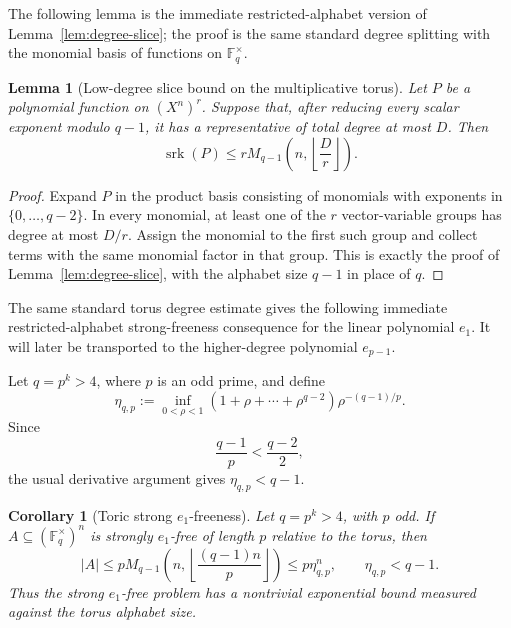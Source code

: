 \documentclass[10pt,a4paper]{amsart}
\newtheorem{corollary}[theorem]{Corollary}
\newtheorem{lemma}[theorem]{Lemma}
\theoremstyle{definition}
\newcommand{\F}{\mathbb F}
\newcommand{\srk}{\operatorname{srk}}
\newcommand{\1}{\mathbf 1}
\begin{document}
The following lemma is the immediate restricted-alphabet version of Lemma~\ref{lem:degree-slice}; the proof is the same standard degree splitting with the monomial basis of functions on $\F_q^\times$.

\begin{lemma}[Low-degree slice bound on the multiplicative torus]\label{lem:torus-degree}
Let $P$ be a polynomial function on $(X^n)^r$.  Suppose that, after reducing every scalar exponent modulo $q-1$, it has a representative of total degree at most $D$.  Then
\[
 \srk(P)\le rM_{q-1}\left(n,\left\lfloor\frac Dr\right\rfloor\right).
\]
\end{lemma}

\begin{proof}
Expand $P$ in the product basis consisting of monomials with exponents in $\{0,\ldots,q-2\}$.  In every monomial, at least one of the $r$ vector-variable groups has degree at most $D/r$.  Assign the monomial to the first such group and collect terms with the same monomial factor in that group.  This is exactly the proof of Lemma~\ref{lem:degree-slice}, with the alphabet size $q-1$ in place of $q$.
\end{proof}

The same standard torus degree estimate gives the following immediate restricted-alphabet strong-freeness consequence for the linear polynomial $e_1$.  It will later be transported to the higher-degree polynomial $e_{p-1}$.

Let $q=p^k>4$, where $p$ is an odd prime, and define
\[
 \eta_{q,p}:=
 \inf_{0<\rho<1}
 (1+\rho+\cdots+\rho^{q-2})
 \rho^{-(q-1)/p}.
\]
Since
\[
 \frac{q-1}{p}<\frac{q-2}{2},
\]
the usual derivative argument gives $\eta_{q,p}<q-1$.

\begin{corollary}[Toric strong $e_1$-freeness]\label{cor:toric-strong-e1}
Let $q=p^k>4$, with $p$ odd.  If $A\subseteq(\F_q^\times)^n$ is strongly $e_1$-free of length $p$ relative to the torus, then
\[
 |A|\le
 pM_{q-1}\left(n,\left\lfloor\frac{(q-1)n}{p}\right\rfloor\right)
 \le p\eta_{q,p}^n,
 \qquad \eta_{q,p}<q-1.
\]
Thus the strong $e_1$-free problem has a nontrivial exponential bound measured against the torus alphabet size.
\end{corollary}
\end{document}
